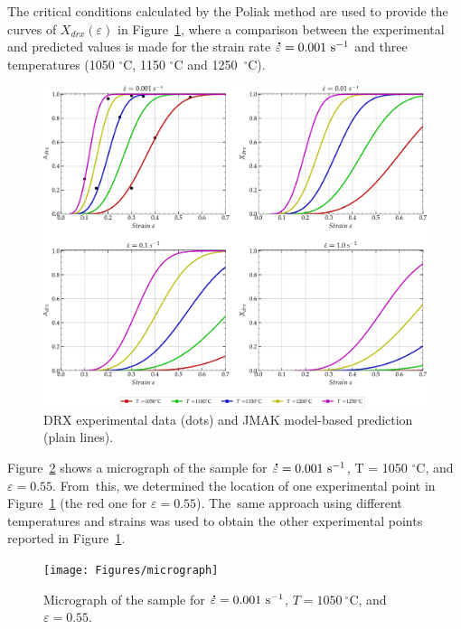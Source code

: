 \documentclass[metals,article,accept,pdftex,moreauthors]{Definitions/mdpi}
\DeclareRobustCommand{\mdot}[1]{\accentset{\mbox{\bfseries .}}{#1}}
\DeclareRobustCommand{\ps}{\text{s}^{-1}}
\begin{document}
The critical conditions calculated by the Poliak method are used to provide the curves of $X_{drx}(\varepsilon)$ in Figure~\ref{fig:nDRX}, where a comparison between the experimental and predicted values is made for the strain rate $\mdot\varepsilon=0.001~\ps$ and three temperatures (1050 $^\circ$C, 1150 $^\circ$C and 1250~$^\circ$C).
\begin{figure}[H]
\centering
	\includegraphics[width=0.99\columnwidth]{Figures/nDRX1}
	\caption{DRX experimental data (dots) and JMAK model-based prediction (plain lines).}
	\label{fig:nDRX}
\end{figure}
Figure~\ref{fig:eDRX} shows a micrograph of the sample for $\mdot\varepsilon=0.001~\ps$, T = 1050 $^\circ$C, and $\varepsilon=0.55$. From~this, we determined the location of one experimental point in Figure~\ref{fig:nDRX} (the red one for $\varepsilon=0.55$). The~same approach using different temperatures and strains was used to obtain the other experimental points reported in Figure~\ref{fig:nDRX}.
\begin{figure}[H]
\centering
	\texttt{[image: Figures/micrograph]}
	\caption{Micrograph of the sample for $\mdot\varepsilon=0.001~\ps$, $T=1050~^\circ$C, and $\varepsilon=0.55$.}
	\label{fig:eDRX}
\end{figure}
\end{document}
